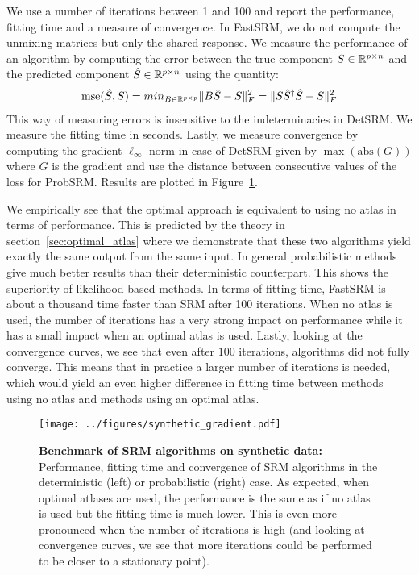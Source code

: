 \documentclass{article}
\begin{document}
We use a number of iterations between 1 and 100 and report the performance,
fitting time and a measure of convergence.
%
In FastSRM, we do not compute the
unmixing matrices but only the shared response.
%
We measure the performance of an algorithm by computing the error between the true component $S \in \mathbb{R}^{p \times n}$ and
the predicted component $\hat{S} \in \mathbb{R}^{p \times n}$ using the quantity:
\begin{align}
\mathrm{mse}(\hat{S}, S) = min_{B \in \mathbb{R}^{p \times p}} \|B \hat{S} - S \|^2_F =  \|S
\hat{S}^{\dagger}\hat{S} - S \|^2_F
\end{align}
%
This way of measuring errors is
insensitive to the indeterminacies in DetSRM.
%
We measure the fitting time in seconds.
%
Lastly, we measure convergence by computing the gradient $\ell_{\infty}$ norm in
case of DetSRM given by $\max(\mathrm{abs}(G))$ where $G$ is the gradient and
use the distance between consecutive values of the loss for ProbSRM.
%
Results are plotted in Figure~\ref{fig:srm:synthetic_gradient}.
%

We empirically see that the optimal approach is equivalent to using no atlas in
terms of performance.
%
This is predicted by the theory in section~\ref{sec:optimal_atlas} where we demonstrate that these two algorithms yield exactly the same output
from the same input.
%
%
In general probabilistic methods give much better results than their deterministic
counterpart.
%
This shows the superiority of likelihood based methods.
%
In terms of fitting time, FastSRM is about a thousand time faster than SRM after
100 iterations.
%
When no atlas is used, the number
of iterations has a very strong impact on performance while it has a small impact
when an optimal atlas is used.
%
Lastly, looking at the convergence curves, we see that even after $100$ iterations, algorithms did
not fully converge.
%
This means that in practice a larger number of
iterations is needed, which would yield an even higher difference in fitting time
between methods using no atlas and methods using an optimal atlas.
%


\begin{figure}
  \centering
  \texttt{[image: ../figures/synthetic\_gradient.pdf]}
  \caption{\textbf{Benchmark of SRM algorithms on synthetic data: } Performance,
    fitting time and convergence of SRM algorithms in the deterministic (left)
    or probabilistic (right) case.
    As expected, when optimal atlases are used,
    the performance is the same as if no atlas is used but the fitting time is
    much lower.
    This is even more pronounced when the number of iterations is
    high (and looking at convergence curves, we see that more iterations could
    be performed to be closer to a stationary point).
  }
  \label{fig:srm:synthetic_gradient}
\end{figure}
\end{document}
